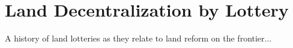 \chapter{Land Decentralization by Lottery} \label{land-lotteries}

A history of land lotteries as they relate to land reform on the frontier... 

	
